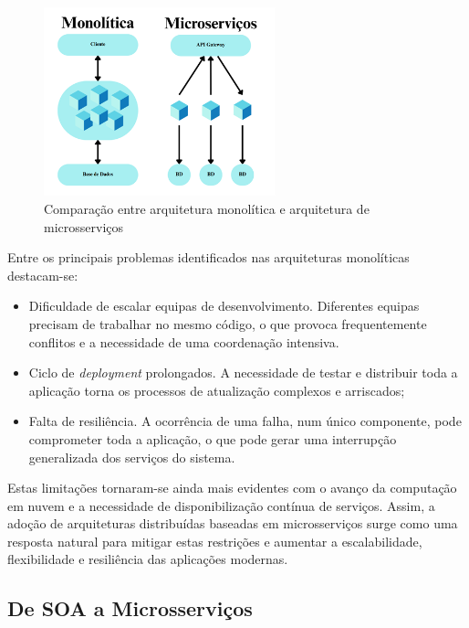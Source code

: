 \begin{figure}[h]
    \centering
    \includegraphics[width=0.6\textwidth]{images/Diagramas/monilitica_vs_microservicos.png}
    \caption{Comparação entre arquitetura monolítica e arquitetura de microsserviços}
    \label{fig:monolitica_microservicos}
\end{figure}

Entre os principais problemas identificados nas arquiteturas monolíticas destacam-se:


\begin{itemize}
    \item Dificuldade de escalar equipas de desenvolvimento. Diferentes equipas precisam de trabalhar no mesmo código, o que provoca frequentemente conflitos e a necessidade de uma coordenação intensiva.
    \item Ciclo de \textit{deployment} prolongados. A necessidade de testar e distribuir toda a aplicação torna os processos de atualização complexos e arriscados;
    \item Falta de resiliência. A ocorrência de uma falha, num único componente, pode comprometer toda a aplicação, o que pode gerar uma interrupção generalizada dos serviços do sistema.
\end{itemize}


Estas limitações tornaram-se ainda mais evidentes com o avanço da computação em nuvem e a necessidade
de disponibilização contínua de serviços. Assim, a adoção de arquiteturas distribuídas baseadas em
microsserviços surge como uma resposta natural para mitigar estas restrições e aumentar a escalabilidade,
flexibilidade e resiliência das aplicações modernas.



\clearpage

\subsection{De SOA a Microsserviços}


